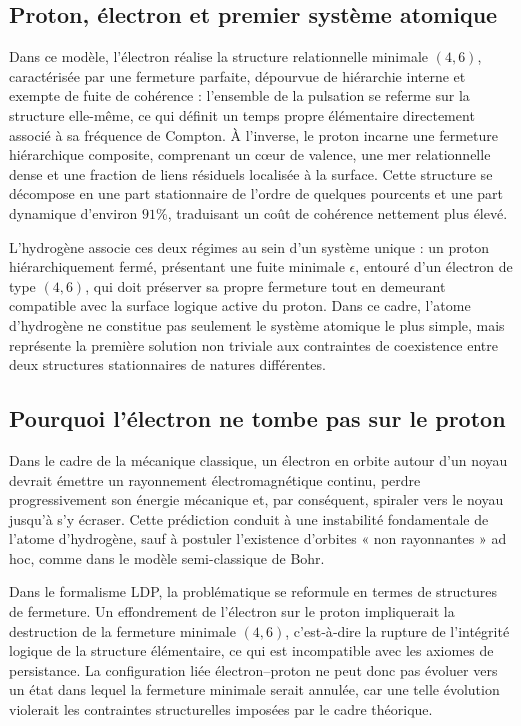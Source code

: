 \documentclass[11pt,a4paper]{article}
\begin{document}
\subsection{Proton, électron et premier système atomique}

Dans ce modèle, l’électron réalise la structure relationnelle minimale \(\left(4,6\right)\), caractérisée par une fermeture parfaite, dépourvue de hiérarchie interne et exempte de fuite de cohérence : l’ensemble de la pulsation se referme sur la structure elle-même, ce qui définit un temps propre élémentaire directement associé à sa fréquence de Compton. À l’inverse, le proton incarne une fermeture hiérarchique composite, comprenant un cœur de valence, une mer relationnelle dense et une fraction de liens résiduels localisée à la surface. Cette structure se décompose en une part stationnaire de l’ordre de quelques pourcents et une part dynamique d’environ \(91\%\), traduisant un coût de cohérence nettement plus élevé.

L’hydrogène associe ces deux régimes au sein d’un système unique : un proton hiérarchiquement fermé, présentant une fuite minimale \(\epsilon\), entouré d’un électron de type \(\left(4,6\right)\), qui doit préserver sa propre fermeture tout en demeurant compatible avec la surface logique active du proton. Dans ce cadre, l’atome d’hydrogène ne constitue pas seulement le système atomique le plus simple, mais représente la première solution non triviale aux contraintes de coexistence entre deux structures stationnaires de natures différentes.

\subsection{Pourquoi l’électron ne tombe pas sur le proton}

Dans le cadre de la mécanique classique, un électron en orbite autour d’un noyau devrait émettre un rayonnement électromagnétique continu, perdre progressivement son énergie mécanique et, par conséquent, spiraler vers le noyau jusqu’à s’y écraser. Cette prédiction conduit à une instabilité fondamentale de l’atome d’hydrogène, sauf à postuler l’existence d’orbites « non rayonnantes » ad hoc, comme dans le modèle semi-classique de Bohr.  

Dans le formalisme LDP, la problématique se reformule en termes de structures de fermeture. Un effondrement de l’électron sur le proton impliquerait la destruction de la fermeture minimale \(\left(4,6\right)\), c’est‑à‑dire la rupture de l’intégrité logique de la structure élémentaire, ce qui est incompatible avec les axiomes de persistance. La configuration liée électron–proton ne peut donc pas évoluer vers un état dans lequel la fermeture minimale serait annulée, car une telle évolution violerait les contraintes structurelles imposées par le cadre théorique.
\end{document}
